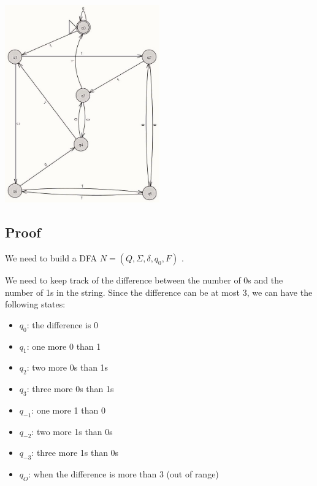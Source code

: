 \documentclass[12pt]{article}
\begin{document}
\begin{minipage}{\textwidth}
    \centering
    \includegraphics[width=0.5\textwidth]{Tarea 2 DFA 2.e.jpg}
    \label{DFA N}
\end{minipage}

\subsection{Proof} 

We need to build a DFA $N = (Q, \Sigma, \delta, q_0, F)$ .

We need to keep track of the difference between the number of 0s and the number of 1s in the string. Since the difference can be at most 3, we can have the following states:
\begin{itemize}
    \item $q_0$: the difference is 0
    \item $q_1$: one more 0 than 1
    \item $q_2$: two more 0s than 1s
    \item $q_3$: three more 0s than 1s
    \item $q_{-1}$: one more 1 than 0
    \item $q_{-2}$: two more 1s than 0s
    \item $q_{-3}$: three more 1s than 0s
    \item $q_O$: when the difference is more than 3 (out of range)

\end{itemize}
\end{document}
